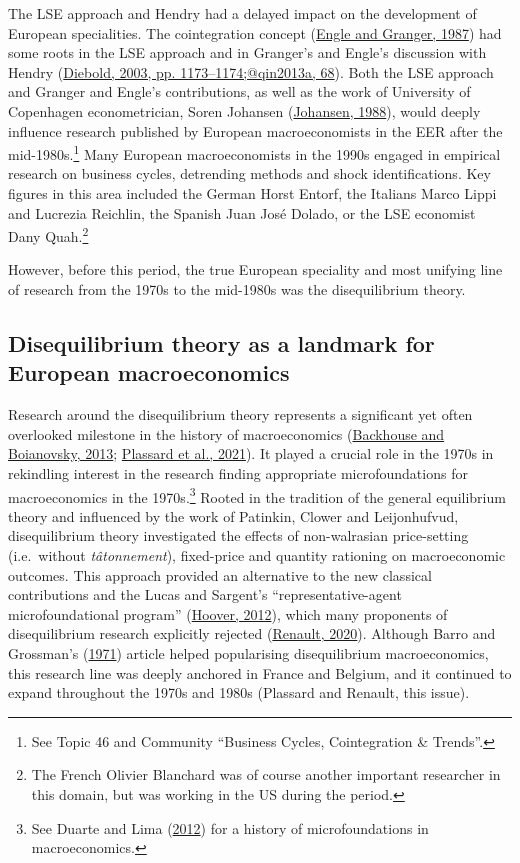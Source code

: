 \documentclass[
  12pt,
  onecolumn]{article}
\begin{document}
The LSE approach and Hendry had a delayed impact on the development of
European specialities. The cointegration concept
(\protect\hyperlink{ref-engle1987}{Engle and Granger, 1987}) had some
roots in the LSE approach and in Granger's and Engle's discussion with
Hendry (\protect\hyperlink{ref-diebold2003}{Diebold, 2003, pp.
1173--1174;@qin2013a, 68}). Both the LSE approach and Granger and
Engle's contributions, as well as the work of University of Copenhagen
econometrician, Soren Johansen
(\protect\hyperlink{ref-johansen1988}{Johansen, 1988}), would deeply
influence research published by European macroeconomists in the EER
after the mid-1980s.\footnote{See Topic 46 and Community ``Business
  Cycles, Cointegration \& Trends''.} Many European macroeconomists in
the 1990s engaged in empirical research on business cycles, detrending
methods and shock identifications. Key figures in this area included the
German Horst Entorf, the Italians Marco Lippi and Lucrezia Reichlin, the
Spanish Juan José Dolado, or the LSE economist Dany Quah.\footnote{The
  French Olivier Blanchard was of course another important researcher in
  this domain, but was working in the US during the period.}

However, before this period, the true European speciality and most
unifying line of research from the 1970s to the mid-1980s was the
disequilibrium theory.

\hypertarget{disequilibrium}{%
\subsection{Disequilibrium theory as a landmark for European
macroeconomics}\label{disequilibrium}}

Research around the disequilibrium theory represents a significant yet
often overlooked milestone in the history of macroeconomics
(\protect\hyperlink{ref-backhouseboianovski2013}{Backhouse and
Boianovsky, 2013}; \protect\hyperlink{ref-plassard2021}{Plassard et al.,
2021}). It played a crucial role in the 1970s in rekindling interest in
the research finding appropriate microfoundations for macroeconomics in
the 1970s.\footnote{See Duarte and Lima
  (\protect\hyperlink{ref-duartelima2012a}{2012}) for a history of
  microfoundations in macroeconomics.} Rooted in the tradition of the
general equilibrium theory and influenced by the work of Patinkin,
Clower and Leijonhufvud, disequilibrium theory investigated the effects
of non-walrasian price-setting (i.e.~without \emph{tâtonnement}),
fixed-price and quantity rationing on macroeconomic outcomes. This
approach provided an alternative to the new classical contributions and
the Lucas and Sargent's ``representative-agent microfoundational
program'' (\protect\hyperlink{ref-hoover2012}{Hoover, 2012}), which many
proponents of disequilibrium research explicitly rejected
(\protect\hyperlink{ref-renault2020a}{Renault, 2020}). Although Barro
and Grossman's (\protect\hyperlink{ref-barro1971}{1971}) article helped
popularising disequilibrium macroeconomics, this research line was
deeply anchored in France and Belgium, and it continued to expand
throughout the 1970s and 1980s (Plassard and Renault, this issue).
\end{document}
